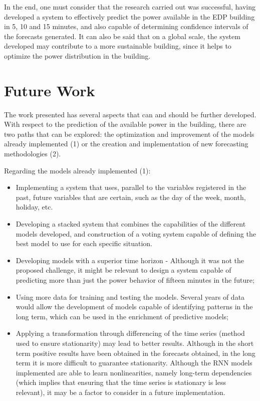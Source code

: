 In the end, one must consider that the research carried out was successful, having developed a system to effectively predict the power available in the \ac{EDP} building in 5, 10 and 15 minutes, and also capable of determining confidence intervals of the forecasts generated. It can also be said that on a global scale, the system developed may contribute to a more sustainable building, since it helps to optimize the power distribution in the building.



\newpage
\section{Future Work}

The work presented has several aspects that can and should be further developed. With respect to the prediction of the available power in the building, there are two paths that can be explored: the optimization and improvement of the models already implemented (1) or the creation and implementation of new forecasting methodologies (2). 

Regarding the models already implemented (1):   

\begin{itemize}
\setlength\itemsep{0.1em}
    \item Implementing a system that uses, parallel to the variables registered in the past, future variables that are certain, such as the day of the week, month, holiday, etc.
    \item Developing a stacked system that combines the capabilities of the different models developed, and construction of a voting system capable of defining the best model to use for each specific situation.
    \item Developing models with a superior time horizon - Although it was not the proposed challenge, it might be relevant to design a system capable of predicting more than just the power behavior of fifteen minutes in the future;
    \item Using more data for training and testing the models. Several years of data would allow the development of models capable of identifying patterns in the long term, which can be used in the enrichment of predictive models;
    \item Applying a transformation through differencing  of the time series (method used to ensure stationarity) may lead to better results. Although in the short term positive results have been obtained in the forecasts obtained, in the long term it is more difficult to guarantee stationarity. Although the \ac{RNN} models implemented are able to learn nonlinearities, namely long-term dependencies (which implies that ensuring that the time series is stationary is less relevant), it may be a factor to consider in a future implementation.
\end{itemize}


